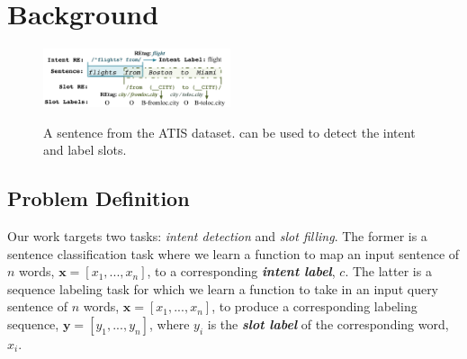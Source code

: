 \section{Background}
\begin{figure}[t!]
  \centering
  \includegraphics[width=0.49\textwidth]{figure/motivation.pdf}\\
  \vspace{-2mm}
  \caption{A sentence from the ATIS dataset. \REs can be used to detect the intent and label slots.}
  \label{atis_sample}
  \vspace{-3mm}
\end{figure}

\vspace{-2mm}
\subsection{Problem Definition}
\vspace{-2mm}
Our work targets two \SLU tasks: \emph{intent detection} and \emph{slot filling}. The former is a sentence classification task where we
learn a function to map an input sentence of $n$ words, $\textbf{x}=[x_{1}, ..., x_{n}]$, to a corresponding \textbf{\emph{intent label}},
$c$. The latter is a sequence labeling task for which we learn a function to take in an input query sentence of $n$ words,
$\textbf{x}=[x_{1}, ..., x_{n}]$, to produce a corresponding labeling sequence, $\textbf{y}=[y_{1}, ..., y_{n}]$, where  $y_i$ is the
\textbf{\emph{slot label}} of the
corresponding word, $x_i$. %


%

